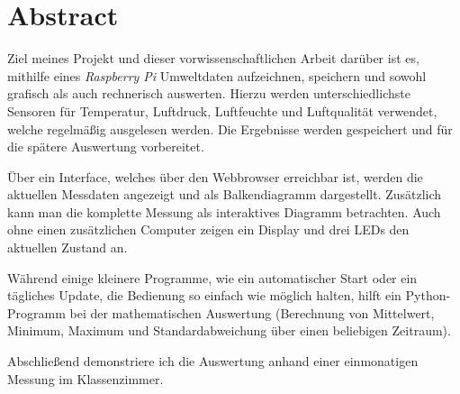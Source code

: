 \chapter*{Abstract}
\label{cha:abstract}

Ziel meines Projekt und dieser vorwissenschaftlichen Arbeit darüber ist es, mithilfe eines \emph{Raspberry Pi} Umweltdaten aufzeichnen, speichern und sowohl grafisch als auch rechnerisch auswerten.
Hierzu werden unterschiedlichste Sensoren für Temperatur, Luftdruck, Luftfeuchte und Luftqualität verwendet, welche regelmäßig ausgelesen werden. Die Ergebnisse werden gespeichert und für die spätere Auswertung vorbereitet.

Über ein Interface, welches über den Webbrowser erreichbar ist, werden die aktuellen Messdaten angezeigt und als Balkendiagramm dargestellt. Zusätzlich kann man die komplette Messung als interaktives Diagramm betrachten. Auch ohne einen zusätzlichen Computer zeigen ein Display und drei LEDs den aktuellen Zustand an.

Während einige kleinere Programme, wie ein automatischer Start oder ein tägliches Update, die Bedienung so einfach wie möglich halten, hilft ein Python-Programm bei der mathematischen Auswertung (Berechnung von Mittelwert, Minimum, Maximum und Standardabweichung über einen beliebigen Zeitraum).

Abschließend demonstriere ich die Auswertung anhand einer einmonatigen Messung im Klassenzimmer.